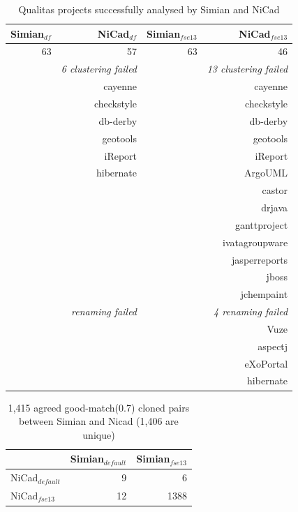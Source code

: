 \documentclass{IEEEtran}
\begin{document}
\begin{table}[H]
	\centering
	\caption{Qualitas projects successfully analysed by Simian and NiCad}
	\label{tab:projects_missing}
	\begin{tabular}{r|r|r|r}
		\hline
		Simian$_{df}$ & NiCad$_{df}$ & Simian$_{fse13}$ & NiCad$_{fse13}$ \\ \hline
		63	& 57 & 63 & 46 \\
		\hline
		& \textit{6 clustering failed} &  & \textit{13 clustering failed} \\
		\hline
		& cayenne   &	& cayenne \\
		& checkstyle &  & checkstyle \\
		& db-derby 	& & db-derby \\
		& geotools 	& & geotools \\
		& iReport 	& & iReport \\
		& hibernate & & ArgoUML \\
		&			& & castor \\
		&			& & drjava \\
		&			& & ganttproject \\
		&			& & ivatagroupware \\
		&			& & jasperreports \\
		&			& & jboss \\
		&			& & jchempaint \\
		\hline
		& \textit{renaming failed} & &  \textit{4 renaming failed} \\
		\hline
		&			& & Vuze \\
		&			& & aspectj \\
		&			& & eXoPortal \\
		&			& &  hibernate \\
		\hline
	\end{tabular}
\end{table}



\begin{table}[H]
	\centering
	\caption{1,415 agreed good-match(0.7) cloned pairs between Simian and Nicad (1,406 are unique)}
	\label{t_agreed_good_clone_pairs}
	\begin{tabular}{l|r|r}
		\hline
		& Simian$_{\mathrm{\textit{default}}}$ & Simian$_{\mathrm{\textit{fse13}}}$ \\ %
		\hline
		NiCad$_{\mathrm{\textit{default}}}$ & 9 & 6 \\ %
		NiCad$_{\mathrm{\textit{fse13}}}$   & 12 & 1388 \\ %
		\hline
	\end{tabular}
\end{table}
\end{document}
